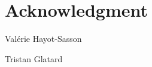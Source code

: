 \documentclass[10pt,journal,compsoc]{IEEEtran}
\begin{document}
  \section*{Acknowledgment}
\fi

\ifCLASSOPTIONcaptionsoff
  \newpage
\fi




\begin{IEEEbiography}{Val\'erie Hayot-Sasson}
\end{IEEEbiography}
\begin{IEEEbiography}{Tristan Glatard}
\end{IEEEbiography}
\end{document}
